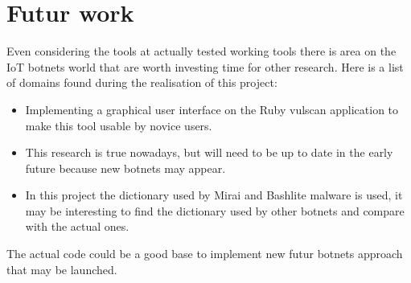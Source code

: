 \documentclass{report}
\begin{document}
\chapter{Futur work}
Even considering the tools at actually tested working tools there is area on the IoT botnets world that are worth investing time for other research. Here is a list of domains found during the realisation of this project:
\begin{itemize}
 \item Implementing a graphical user interface on the Ruby vulscan application to make this tool usable by novice users.
 \item This research is true nowadays, but will need to be up to date in the early future because new botnets may appear.
 \item In this project the dictionary used by Mirai and Bashlite malware is used, it may be interesting to find the dictionary used by other botnets and compare with the actual ones. 
\end{itemize}
The actual code could be a good base to implement new futur botnets approach that may be launched.

\printbibliography

\listoffigures
\end{document}
